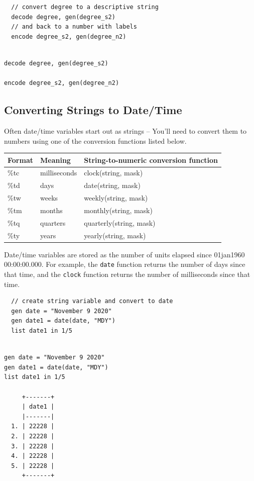 \documentclass[]{book}
\begin{document}
\begin{verbatim}
  // convert degree to a descriptive string
  decode degree, gen(degree_s2)
  // and back to a number with labels
  encode degree_s2, gen(degree_n2)
\end{verbatim}

\begin{verbatim}

decode degree, gen(degree_s2)

encode degree_s2, gen(degree_n2)
\end{verbatim}

\subsection{Converting Strings to
Date/Time}\label{converting-strings-to-datetime}

Often date/time variables start out as strings -- You'll need to convert
them to numbers using one of the conversion functions listed below.

\begin{longtable}[]{@{}lll@{}}
\toprule
Format & Meaning & String-to-numeric conversion function\tabularnewline
\midrule
\endhead
\%tc & milliseconds & clock(string, mask)\tabularnewline
\%td & days & date(string, mask)\tabularnewline
\%tw & weeks & weekly(string, mask)\tabularnewline
\%tm & months & monthly(string, mask)\tabularnewline
\%tq & quarters & quarterly(string, mask)\tabularnewline
\%ty & years & yearly(string, mask)\tabularnewline
\bottomrule
\end{longtable}

Date/time variables are stored as the number of units elapsed since
01jan1960 00:00:00.000. For example, the \texttt{date} function returns
the number of days since that time, and the \texttt{clock} function
returns the number of milliseconds since that time.

\begin{verbatim}
  // create string variable and convert to date
  gen date = "November 9 2020"
  gen date1 = date(date, "MDY")
  list date1 in 1/5
\end{verbatim}

\begin{verbatim}

gen date = "November 9 2020"
gen date1 = date(date, "MDY")
list date1 in 1/5

     +-------+
     | date1 |
     |-------|
  1. | 22228 |
  2. | 22228 |
  3. | 22228 |
  4. | 22228 |
  5. | 22228 |
     +-------+
\end{verbatim}
\end{document}
